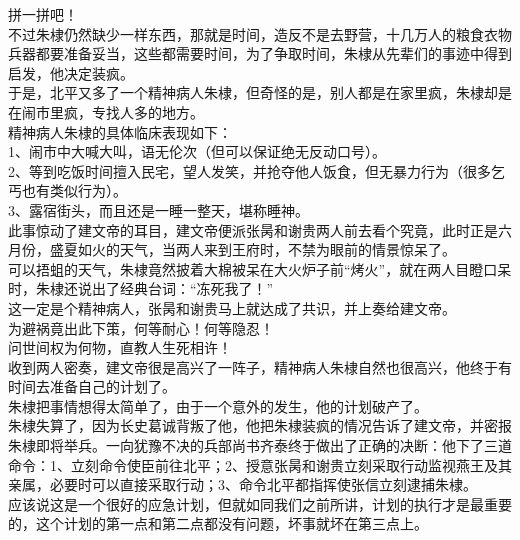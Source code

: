 \begin{multicols}{\theparacolNo}
拼一拼吧！\\

不过朱棣仍然缺少一样东西，那就是时间，造反不是去野营，十几万人的粮食衣物兵器都要准备妥当，这些都需要时间，为了争取时间，朱棣从先辈们的事迹中得到启发，他决定装疯。\\

于是，北平又多了一个精神病人朱棣，但奇怪的是，别人都是在家里疯，朱棣却是在闹市里疯，专找人多的地方。\\

精神病人朱棣的具体临床表现如下：\\

1、闹市中大喊大叫，语无伦次（但可以保证绝无反动口号）。\\

2、等到吃饭时间擅入民宅，望人发笑，并抢夺他人饭食，但无暴力行为（很多乞丐也有类似行为）。\\

3、露宿街头，而且还是一睡一整天，堪称睡神。\\

此事惊动了建文帝的耳目，建文帝便派张昺和谢贵两人前去看个究竟，此时正是六月份，盛夏如火的天气，当两人来到王府时，不禁为眼前的情景惊呆了。\\

可以捂蛆的天气，朱棣竟然披着大棉被呆在大火炉子前“烤火”，就在两人目瞪口呆时，朱棣还说出了经典台词：“冻死我了！”\\

这一定是个精神病人，张昺和谢贵马上就达成了共识，并上奏给建文帝。\\

为避祸竟出此下策，何等耐心！何等隐忍！\\

问世间权为何物，直教人生死相许！\\

收到两人密奏，建文帝很是高兴了一阵子，精神病人朱棣自然也很高兴，他终于有时间去准备自己的计划了。\\

朱棣把事情想得太简单了，由于一个意外的发生，他的计划破产了。\\

朱棣失算了，因为长史葛诚背叛了他，他把朱棣装疯的情况告诉了建文帝，并密报朱棣即将举兵。一向犹豫不决的兵部尚书齐泰终于做出了正确的决断：他下了三道命令：1、立刻命令使臣前往北平；2、授意张昺和谢贵立刻采取行动监视燕王及其亲属，必要时可以直接采取行动；3、命令北平都指挥使张信立刻逮捕朱棣。\\

应该说这是一个很好的应急计划，但就如同我们之前所讲，计划的执行才是最重要的，这个计划的第一点和第二点都没有问题，坏事就坏在第三点上。\\


\end{multicols}
